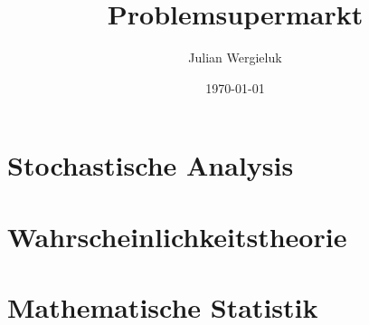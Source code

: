 \documentclass[12pt,oldfontcommands,oneside,a4paper,article]{memoir}
\title{Problemsupermarkt}\author{Julian Wergieluk}\date{\today}
\begin{document}
\pagestyle{headings}

\maketitle
\tableofcontents


\setcounter{secnumdepth}{4}
\renewcommand{\theparagraph}{\arabic{chapter}.\arabic{paragraph}}
\renewcommand{\theenumi}{\Alph{enumi}.}
\renewcommand{\labelenumi}{\theenumi}


\chapter{Stochastische Analysis}



\chapter{Wahrscheinlichkeitstheorie}



\chapter{Mathematische Statistik}










\backmatter

\printbibliography
%
%
\end{document}
